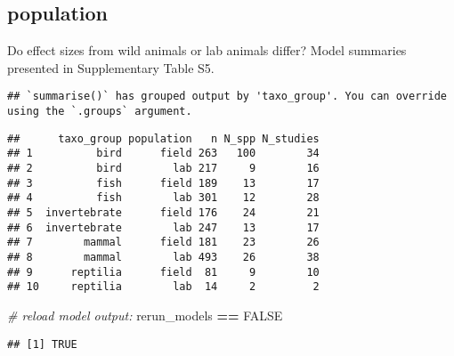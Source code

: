 \documentclass[]{article}
\newenvironment{Shaded}{\begin{snugshade}}{\end{snugshade}}
\newcommand{\KeywordTok}[1]{\textcolor[rgb]{0.13,0.29,0.53}{\textbf{#1}}}
\newcommand{\DataTypeTok}[1]{\textcolor[rgb]{0.13,0.29,0.53}{#1}}
\newcommand{\StringTok}[1]{\textcolor[rgb]{0.31,0.60,0.02}{#1}}
\newcommand{\CommentTok}[1]{\textcolor[rgb]{0.56,0.35,0.01}{\textit{#1}}}
\newcommand{\OtherTok}[1]{\textcolor[rgb]{0.56,0.35,0.01}{#1}}
\newcommand{\OperatorTok}[1]{\textcolor[rgb]{0.81,0.36,0.00}{\textbf{#1}}}
\newcommand{\NormalTok}[1]{#1}
\begin{document}
\subsection{population}\label{population}

Do effect sizes from wild animals or lab animals differ? Model summaries
presented in Supplementary Table S5.

\begin{Shaded}
\end{Shaded}

\begin{verbatim}
## `summarise()` has grouped output by 'taxo_group'. You can override using the `.groups` argument.
\end{verbatim}

\begin{verbatim}
##      taxo_group population   n N_spp N_studies
## 1          bird      field 263   100        34
## 2          bird        lab 217     9        16
## 3          fish      field 189    13        17
## 4          fish        lab 301    12        28
## 5  invertebrate      field 176    24        21
## 6  invertebrate        lab 247    13        17
## 7        mammal      field 181    23        26
## 8        mammal        lab 493    26        38
## 9      reptilia      field  81     9        10
## 10     reptilia        lab  14     2         2
\end{verbatim}

\begin{Shaded}
\begin{Highlighting}[]
\CommentTok{# reload model output:}
\NormalTok{rerun_models }\OperatorTok{==}\StringTok{ }\OtherTok{FALSE}
\end{Highlighting}
\end{Shaded}

\begin{verbatim}
## [1] TRUE
\end{verbatim}
\end{document}
